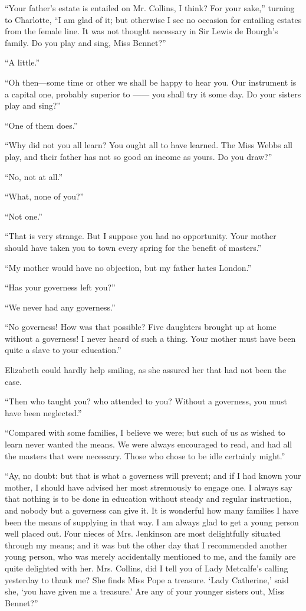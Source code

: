 \documentclass[12pt,openright]{book}
\begin{document}
“Your father’s estate is entailed on Mr. Collins, I think? For your sake,” turning to Charlotte, “I am glad of it; but otherwise I see no occasion for entailing estates from the female line. It was not thought necessary in Sir Lewis de Bourgh’s family. Do you play and sing, Miss Bennet?”

“A little.”

“Oh then—some time or other we shall be happy to hear you. Our instrument is a capital one, probably superior to —— you shall try it some day. Do your sisters play and sing?”

“One of them does.”

“Why did not you all learn? You ought all to have learned. The Miss Webbs all play, and their father has not so good an income as yours. Do you draw?”

“No, not at all.”

“What, none of you?”

“Not one.”

“That is very strange. But I suppose you had no opportunity. Your mother should have taken you to town every spring for the benefit of masters.”

“My mother would have no objection, but my father hates London.”

“Has your governess left you?”

“We never had any governess.”

“No governess! How was that possible? Five daughters brought up at home without a governess! I never heard of such a thing. Your mother must have been quite a slave to your education.”

Elizabeth could hardly help smiling, as she assured her that had not been the case.

“Then who taught you? who attended to you? Without a governess, you must have been neglected.”

“Compared with some families, I believe we were; but such of us as wished to learn never wanted the means. We were always encouraged to read, and had all the masters that were necessary. Those who chose to be idle certainly might.”

“Ay, no doubt: but that is what a governess will prevent; and if I had known your mother, I should have advised her most strenuously to engage one. I always say that nothing is to be done in education without steady and regular instruction, and nobody but a governess can give it. It is wonderful how many families I have been the means of supplying in that way. I am always glad to get a young person well placed out. Four nieces of Mrs. Jenkinson are most delightfully situated through my means; and it was but the other day that I recommended another young person, who was merely accidentally mentioned to me, and the family are quite delighted with her. Mrs. Collins, did I tell you of Lady Metcalfe’s calling yesterday to thank me? She finds Miss Pope a treasure. ‘Lady Catherine,’ said she, ‘you have given me a treasure.’ Are any of your younger sisters out, Miss Bennet?”
\end{document}
